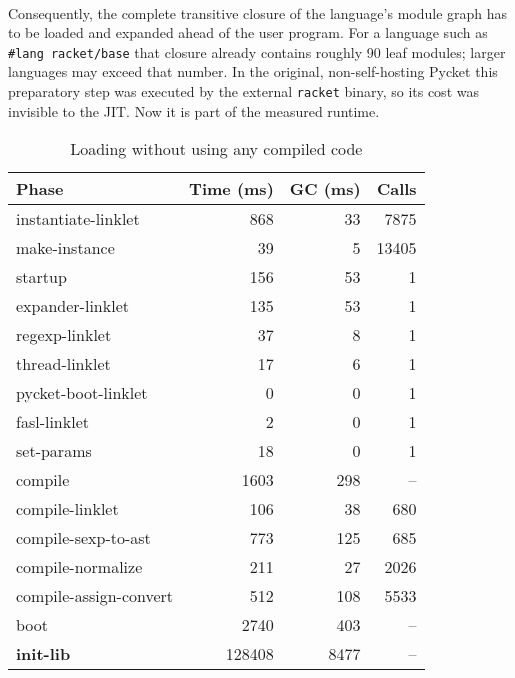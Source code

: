 		\paragraph{}%
			Consequently, the complete transitive closure of the language's module graph has to be loaded and expanded ahead of the user program. For a language such as \texttt{\#lang racket/base} that closure already contains roughly 90 leaf modules; larger languages may exceed that number. In the original, non-self-hosting Pycket this preparatory step was executed by the external \texttt{racket} binary, so its cost was invisible to the JIT. Now it is part of the measured runtime.

		\vspace{1.5em}

		\begin{table}[!h]
		\centering
		\small
		\begin{tabular}{@{}lrrr@{}}
			\toprule
			Phase & Time (ms) & GC (ms) & Calls \\ \midrule
			instantiate-linklet            &    868 &   33 & 7875 \\
			make-instance                  &     39 &    5 & 13405 \\
			startup                        &    156 &   53 & 1 \\
			\quad expander-linklet         &    135 &   53 & 1 \\
			\quad regexp-linklet                 &     37 &    8 & 1 \\
			\quad thread-linklet                 &     17 &    6 & 1 \\
			\quad pycket-boot-linklet            &      0 &    0 & 1 \\
			\quad fasl-linklet             &      2 &    0 & 1 \\
			\quad set-params               &     18 &    0 & 1 \\ \midrule
			compile                        &   1603 &  298 & -- \\
			\quad compile-linklet          &    106 &   38 & 680 \\
			\quad compile-sexp-to-ast      &    773 &  125 & 685 \\
			\quad compile-normalize        &    211 &   27 & 2026 \\
			\quad compile-assign-convert   &    512 &  108 & 5533 \\ \midrule
			boot            		   	   &   2740 &  403 & -- \\
			\textbf{init-lib}			   &	128408 &   8477 & -- \\
			\bottomrule
		\end{tabular}
		\caption{Loading  without using any compiled code}
		\label{table:boot-no-compiled}
		\end{table}

